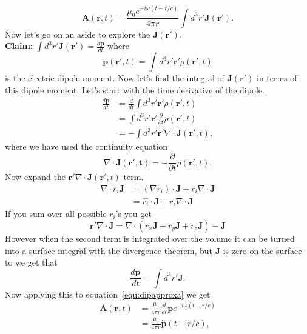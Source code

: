 \documentclass[12pt]{article}
\newcommand{\br}{\mathbf{r}}
\begin{document}
\begin{equation}
   \mathbf{A}(\br,t) = \frac{\mu_0e^{-i\omega(t-r/c)}}{4\pi r} \int d^3r' \mathbf{J}(\br').
   \label{equ:dipapproxa}
\end{equation}
Now let's go on an aside to explore the $\mathbf{J}(\br')$. \\
\textbf{Claim:} $\int d^3r' \mathbf{J}(\br') = \frac{d\mathbf{p}}{dt}$ where
\begin{equation}
   \mathbf{p}(\br',t) = \int d^3r' \br'\rho(\br',t)
\end{equation}
is the electric dipole moment. Now let's find the integral of $\mathbf{J}(\br')$ in terms of this dipole moment. Let's start with the time derivative of the dipole.
\begin{align}
   \frac{d\mathbf{p}}{dt} &= \frac{d}{dt}\int d^3r' \br'\rho(\br',t) \\
   &= \int d^3r' \br' \frac{\partial}{\partial t}\rho(\br',t) \\
   &= -\int d^3r' \br' \nabla \cdot \mathbf{J}(\br',t),
\end{align}
where we have used the continuity equation
\begin{equation}
   \nabla \cdot \mathbf{J(\br',t)} = -\frac{\partial}{\partial t} \rho(\br',t).
\end{equation}
Now expand the $\br' \nabla \cdot \mathbf{J}(\br',t)$ term.
\begin{align}
   \nabla \cdot r_i\mathbf{J} &= (\nabla r_i) \cdot \mathbf{J} + r_i\nabla\cdot\mathbf{J} \\
   &= \hat{r_i} \cdot \mathbf{J} + r_i\nabla\cdot\mathbf{J}
\end{align}
If you sum over all possible $r_i$'s you get
\begin{equation}
   \br'\nabla\cdot\mathbf{J} = \nabla\cdot (r_x\mathbf{J}+r_y\mathbf{J}+r_z\mathbf{J}) - \mathbf{J}
\end{equation}
However when the second term is integrated over the volume it can be turned into a surface integral with the divergence theorem, but $\mathbf{J}$ is zero on the surface to we get that
\begin{equation}
   \frac{d\mathbf{p}}{dt} = \int d^3r' \mathbf{J}.
\end{equation}
Now applying this to equation~\ref{equ:dipapproxa} we get
\begin{align}
   \mathbf{A}(\br,t) &= \frac{\mu_0}{4\pi r} \frac{d}{dt}\mathbf{p}e^{-i\omega(t-r/c)} \\
   &= \frac{\mu_0}{4\pi r} \dot{\mathbf{p}}(t-r/c),
\end{align}
\end{document}
